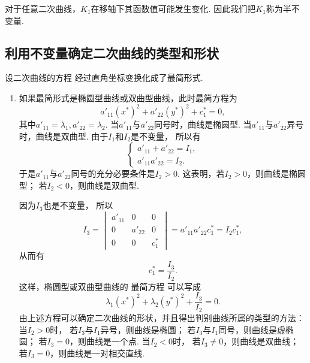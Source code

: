 \begin{remark}
对于任意二次曲线，\(K_1\)在移轴下其函数值可能发生变化.
因此我们把\(K_1\)称为半不变量.
\end{remark}

\subsection{利用不变量确定二次曲线的类型和形状}
设二次曲线的方程 
经过直角坐标变换化成了最简形式.
\begin{enumerate}
	\item 如果最简形式是椭圆型曲线或双曲型曲线，此时最简方程为\begin{equation*}
		a'_{11} (x^*)^2 + a'_{22} (y^*)^2 + c^*_1 = 0,
	\end{equation*}
	其中\(
		a'_{11} = \lambda_1,
		a'_{22} = \lambda_2
	\).
	当\(a'_{11}\)与\(a'_{22}\)同号时，曲线是椭圆型.
	当\(a'_{11}\)与\(a'_{22}\)异号时，曲线是双曲型.
	由于\(I_1\)和\(I_2\)是不变量，
	所以有\begin{equation*}
		\left\{ \begin{array}{l}
			a'_{11} + a'_{22} = I_1, \\
			a'_{11} a'_{22} = I_2.
		\end{array} \right.
	\end{equation*}
	于是\(a'_{11}\)与\(a'_{22}\)同号的充分必要条件是\(I_2 > 0\).
	这表明，若\(I_2 > 0\)，则曲线是椭圆型；
	若\(I_2 < 0\)，则曲线是双曲型.

	因为\(I_3\)也是不变量，
	所以\begin{equation*}
		I_3
		= \begin{vmatrix}
			a'_{11} & 0 & 0 \\
			0 & a'_{22} & 0 \\
			0 & 0 & c^*_1
		\end{vmatrix}
		= a'_{11} a'_{22} c^*_1
		= I_2 c^*_1,
	\end{equation*}
	从而有\begin{equation*}
		c^*_1 = \frac{I_3}{I_2}.
	\end{equation*}
	这样，椭圆型或双曲型曲线的
	最简方程 
	可以写成\begin{equation*}
		\lambda_1 (x^*)^2 + \lambda_2 (y^*)^2 + \frac{I_3}{I_2} = 0.
	\end{equation*}
	由上述方程可以确定二次曲线的形状，并且得出判别曲线所属的类型的方法：
	当\(I_2 > 0\)时，
		若\(I_3\)与\(I_1\)异号，则曲线是椭圆；
		若\(I_3\)与\(I_1\)同号，则曲线是虚椭圆；
		若\(I_3 = 0\)，则曲线是一个点.
	当\(I_2 < 0\)时，
		若\(I_3 \neq 0\)，则曲线是双曲线；
		若\(I_3 = 0\)，则曲线是一对相交直线.


\end{enumerate}
